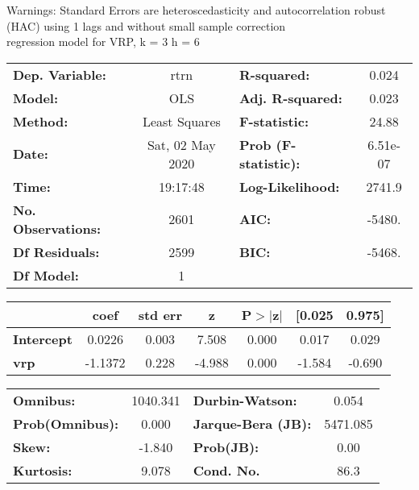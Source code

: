 Warnings: \newline
 [1] Standard Errors are heteroscedasticity and autocorrelation robust (HAC) using 1 lags and without small sample correction\\ 

regression model for VRP, k = 3 h = 6\begin{center}
\begin{tabular}{lclc}
\toprule
\textbf{Dep. Variable:}    &       rtrn       & \textbf{  R-squared:         } &     0.024   \\
\textbf{Model:}            &       OLS        & \textbf{  Adj. R-squared:    } &     0.023   \\
\textbf{Method:}           &  Least Squares   & \textbf{  F-statistic:       } &     24.88   \\
\textbf{Date:}             & Sat, 02 May 2020 & \textbf{  Prob (F-statistic):} &  6.51e-07   \\
\textbf{Time:}             &     19:17:48     & \textbf{  Log-Likelihood:    } &    2741.9   \\
\textbf{No. Observations:} &        2601      & \textbf{  AIC:               } &    -5480.   \\
\textbf{Df Residuals:}     &        2599      & \textbf{  BIC:               } &    -5468.   \\
\textbf{Df Model:}         &           1      & \textbf{                     } &             \\
\bottomrule
\end{tabular}
\begin{tabular}{lcccccc}
                   & \textbf{coef} & \textbf{std err} & \textbf{z} & \textbf{P$> |$z$|$} & \textbf{[0.025} & \textbf{0.975]}  \\
\midrule
\textbf{Intercept} &       0.0226  &        0.003     &     7.508  &         0.000        &        0.017    &        0.029     \\
\textbf{vrp}       &      -1.1372  &        0.228     &    -4.988  &         0.000        &       -1.584    &       -0.690     \\
\bottomrule
\end{tabular}
\begin{tabular}{lclc}
\textbf{Omnibus:}       & 1040.341 & \textbf{  Durbin-Watson:     } &    0.054  \\
\textbf{Prob(Omnibus):} &   0.000  & \textbf{  Jarque-Bera (JB):  } & 5471.085  \\
\textbf{Skew:}          &  -1.840  & \textbf{  Prob(JB):          } &     0.00  \\
\textbf{Kurtosis:}      &   9.078  & \textbf{  Cond. No.          } &     86.3  \\
\bottomrule
\end{tabular}
\end{center}

